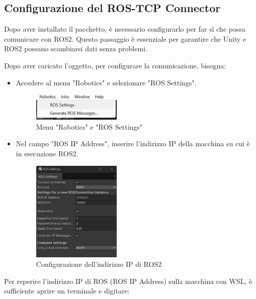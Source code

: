 \documentclass[11pt]{report}
\begin{document}
\subsection*{\textbf{Configurazione del ROS-TCP Connector}}

Dopo aver installato il pacchetto, è necessario configurarlo per far sì che possa comunicare con ROS2. Questo passaggio è essenziale per garantire che Unity e ROS2 possano scambiarsi dati senza problemi.

Dopo aver caricato l’oggetto, per configurare la comunicazione, bisogna:

\begin{itemize}
    \item Accedere al menu "Robotics" e selezionare "ROS Settings".
    \begin{figure}[H]
        \centering
        \includegraphics[width=0.4\textwidth]{images/rostcp2.jpg}
        \caption{Menu "Robotics" e "ROS Settings"}
        \label{fig:rostcp2}
    \end{figure}
    
    \item Nel campo "ROS IP Address", inserire l'indirizzo IP della macchina su cui è in esecuzione ROS2.
    \begin{figure}[H]
        \centering
        \includegraphics[width=0.4\textwidth]{images/rostcp4.jpg}
        \caption{Configurazione dell'indirizzo IP di ROS2}
        \label{fig:rostcp4}
    \end{figure}
\end{itemize}

Per reperire l'indirizzo IP di ROS (ROS IP Address) sulla macchina con WSL, è sufficiente aprire un terminale e digitare:
\end{document}
